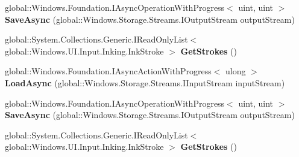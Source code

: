 \begin{DoxyCompactItemize}
\item 
\mbox{\label{interface_windows_1_1_u_i_1_1_input_1_1_inking_1_1_i_ink_stroke_container_a3b12ede6927ca0d6c499746700400fcf}} 
global\+::\+Windows.\+Foundation.\+I\+Async\+Operation\+With\+Progress$<$ uint, uint $>$ {\bfseries Save\+Async} (global\+::\+Windows.\+Storage.\+Streams.\+I\+Output\+Stream output\+Stream)
\item 
\mbox{\label{interface_windows_1_1_u_i_1_1_input_1_1_inking_1_1_i_ink_stroke_container_a71ca3cf2eb98b4245542df72cce510fb}} 
global\+::\+System.\+Collections.\+Generic.\+I\+Read\+Only\+List$<$ global\+::\+Windows.\+U\+I.\+Input.\+Inking.\+Ink\+Stroke $>$ {\bfseries Get\+Strokes} ()
\item 
\mbox{\label{interface_windows_1_1_u_i_1_1_input_1_1_inking_1_1_i_ink_stroke_container_a9d69a26a67513752e224a312eed08d6a}} 
global\+::\+Windows.\+Foundation.\+I\+Async\+Action\+With\+Progress$<$ ulong $>$ {\bfseries Load\+Async} (global\+::\+Windows.\+Storage.\+Streams.\+I\+Input\+Stream input\+Stream)
\item 
\mbox{\label{interface_windows_1_1_u_i_1_1_input_1_1_inking_1_1_i_ink_stroke_container_a3b12ede6927ca0d6c499746700400fcf}} 
global\+::\+Windows.\+Foundation.\+I\+Async\+Operation\+With\+Progress$<$ uint, uint $>$ {\bfseries Save\+Async} (global\+::\+Windows.\+Storage.\+Streams.\+I\+Output\+Stream output\+Stream)
\item 
\mbox{\label{interface_windows_1_1_u_i_1_1_input_1_1_inking_1_1_i_ink_stroke_container_a71ca3cf2eb98b4245542df72cce510fb}} 
global\+::\+System.\+Collections.\+Generic.\+I\+Read\+Only\+List$<$ global\+::\+Windows.\+U\+I.\+Input.\+Inking.\+Ink\+Stroke $>$ {\bfseries Get\+Strokes} ()
\item 
\mbox{\label{interface_windows_1_1_u_i_1_1_input_1_1_inking_1_1_i_ink_stroke_container_a9d69a26a67513752e224a312eed08d6a}} 

\end{DoxyCompactItemize}

